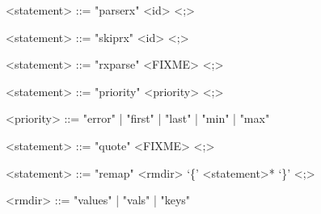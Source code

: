 \documentclass{mitsuba}
\begin{document}
\begin{grammar}
<statement> ::= "parserx" <id> <;>

<statement> ::= "skiprx" <id> <;>

<statement> ::= "rxparse" <FIXME> <;>
\end{grammar}

\begin{grammar}
<statement> ::= "priority" <priority> <;>

<priority> ::= "error" | "first" | "last" | "min" | "max"
\end{grammar}

\begin{grammar}
<statement> ::= "quote" <FIXME> <;>
\end{grammar}

\begin{grammar}
<statement> ::= "remap" <rmdir> `\{' <statement>* `\}' <;>

<rmdir> ::= "values" | "vals" | "keys"
\end{grammar}


\printindex

\end{document}
